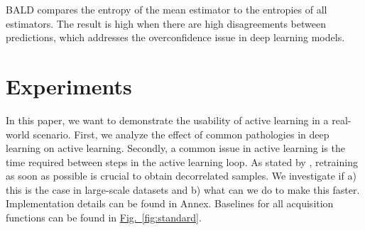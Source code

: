 \documentclass{article}
\newcommand{\figref}[1]{\hyperref[#1]{Fig.\ \ref*{#1}}}
\newcommand{\E}{{\mathbb E}}
\begin{document}
BALD compares the entropy of the mean estimator to the entropies of all estimators. The result is high when there are high disagreements between predictions, which addresses the overconfidence issue in deep learning models.



\section{Experiments}

In this paper, we want to demonstrate the usability of active learning in a real-world scenario. First, we analyze the effect of common pathologies in deep learning on active learning. Secondly, a common issue in active learning is the time required between steps in the active learning loop. As stated by \citet{kirsch2019batchbald}, retraining as soon as possible is crucial to obtain decorrelated samples. We investigate if a) this is the case in large-scale datasets and b) what can we do to make this faster. Implementation details can be found in Annex. Baselines for all  acquisition functions can be found in \figref{fig:standard}.

\end{document}
